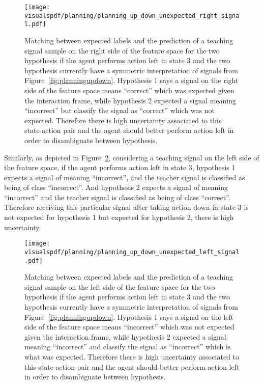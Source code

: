 \begin{figure}[!ht]
  \centering
  \texttt{[image: \\visualspdf/planning/planning\_up\_down\_unexpected\_right\_signal.pdf]}
  \caption{Matching between expected labels and the prediction of a teaching signal sample on the right side of the feature space for the two hypothesis if the agent performs action left in state 3 and the two hypothesis currently have a symmetric interpretation of signals from Figure~\ref{fig:planningupdown}. Hypothesis 1 says a signal on the right side of the feature space means ``correct'' which was expected given the interaction frame, while hypothesis 2 expected a signal meaning ``incorrect'' but classify the signal as ``correct'' which was not expected. Therefore there is high uncertainty associated to this state-action pair and the agent should better perform action left in order to disambiguate between hypothesis.}
  \label{fig:uncertaintymeaningupdownunexpectedright}
\end{figure}

Similarly, as depicted in Figure~\ref{fig:uncertaintymeaningupdownunexpectedleft}, considering a teaching signal on the left side of the feature space, if the agent performs action left in state 3, hypothesis 1 expects a signal of meaning ``incorrect'', and the teacher signal is classified as being of class ``incorrect''. And hypothesis 2 expects a signal of meaning ``incorrect'' and the teacher signal is classified as being of class ``correct''. Therefore receiving this particular signal after taking action down in state 3 is not expected for hypothesis 1 but expected for hypothesis 2, there is high uncertainty.

\begin{figure}[!ht]
  \centering
  \texttt{[image: \\visualspdf/planning/planning\_up\_down\_unexpected\_left\_signal.pdf]}
  \caption{Matching between expected labels and the prediction of a teaching signal sample on the left side of the feature space for the two hypothesis if the agent performs action left in state 3 and the two hypothesis currently have a symmetric interpretation of signals from Figure~\ref{fig:planningupdown}. Hypothesis 1 says a signal on the left side of the feature space means ``incorrect'' which was not expected given the interaction frame, while hypothesis 2 expected a signal meaning ``incorrect'' and classify the signal as ``incorrect'' which is what was expected. Therefore there is high uncertainty associated to this state-action pair and the agent should better perform action left in order to disambiguate between hypothesis.}
  \label{fig:uncertaintymeaningupdownunexpectedleft}
\end{figure}















